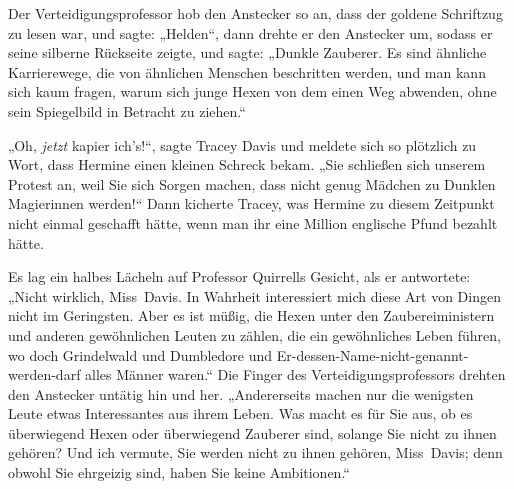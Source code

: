 Der Verteidigungsprofessor hob den Anstecker so an, dass der goldene Schriftzug \SPHEW zu lesen war, und sagte: „Helden“, dann drehte er den Anstecker um, sodass er seine silberne Rückseite zeigte, und sagte: „Dunkle Zauberer. Es sind ähnliche Karrierewege, die von ähnlichen Menschen beschritten werden, und man kann sich kaum fragen, warum sich junge Hexen von dem einen Weg abwenden, ohne sein Spiegelbild in Betracht zu ziehen.“

„Oh, \emph{jetzt} kapier ich’s!“, sagte Tracey Davis und meldete sich so plötzlich zu Wort, dass Hermine einen kleinen Schreck bekam. „Sie schließen sich unserem Protest an, weil Sie sich Sorgen machen, dass nicht genug Mädchen zu Dunklen Magierinnen werden!“ Dann kicherte Tracey, was Hermine zu diesem Zeitpunkt nicht einmal geschafft hätte, wenn man ihr eine Million englische Pfund bezahlt hätte.

Es lag ein halbes Lächeln auf Professor Quirrells Gesicht, als er antwortete: „Nicht wirklich, Miss~Davis. In Wahrheit interessiert mich diese Art von Dingen nicht im Geringsten. Aber es ist müßig, die Hexen unter den Zaubereiministern und anderen gewöhnlichen Leuten zu zählen, die ein gewöhnliches Leben führen, wo doch Grindelwald und Dumbledore und Er-dessen-Name-nicht-genannt-werden-darf alles Männer waren.“ Die Finger des Verteidigungsprofessors drehten den Anstecker untätig hin und her. „Andererseits machen nur die wenigsten Leute etwas Interessantes aus ihrem Leben. Was macht es für Sie aus, ob es überwiegend Hexen oder überwiegend Zauberer sind, solange Sie nicht zu ihnen gehören? Und ich vermute, Sie werden nicht zu ihnen gehören, Miss~Davis; denn obwohl Sie ehrgeizig sind, haben Sie keine Ambitionen.“

